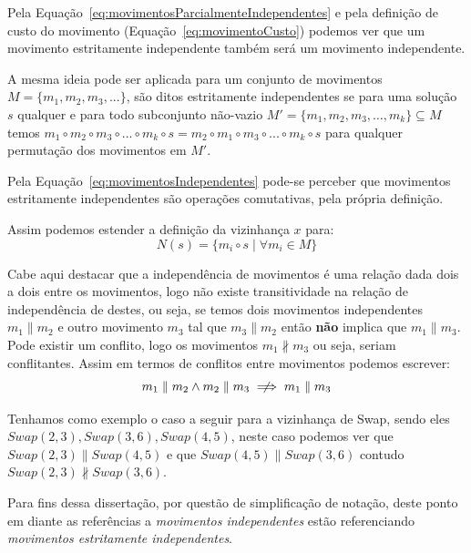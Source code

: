 Pela Equação~\ref{eq:movimentosParcialmenteIndependentes} e pela definição de custo do movimento (Equação~\ref{eq:movimentoCusto}) podemos ver que um movimento estritamente independente também será um movimento independente.

A mesma ideia pode ser aplicada para um conjunto de movimentos $M = \{ m_1, m_2, m_3, ...\}$, são ditos estritamente independentes se para uma solução $s$ qualquer e para todo subconjunto não-vazio $M' = \{ m_1, m_2, m_3, \dots, m_k \} \subseteq M$ temos $m_1 \circ m_2 \circ m_3 \circ ...\circ m_k \circ s = m_2 \circ m_1 \circ m_3 \circ ...\circ m_k \circ s$ para qualquer permutação dos movimentos em $M'$.

Pela Equação~\ref{eq:movimentosIndependentes} pode-se perceber que movimentos estritamente independentes são operações comutativas, pela própria definição.

Assim podemos estender a definição da vizinhança $x$ para:
\begin{equation}  \label{eq:vizinhanca}
N(s) = \{ m_i \circ s \mid \forall m_i \in M \}
\end{equation}

Cabe aqui destacar que a independência de movimentos é uma relação dada dois a dois entre os movimentos, logo não existe transitividade na relação de independência de destes, ou seja, se temos dois movimentos independentes $m_1 \parallel m_2$ e outro movimento $m_3$ tal que $m_3 \parallel m_2$ então \textbf{não} implica que $m_1 \parallel m_3$.
Pode existir um conflito, logo os movimentos $m_1 \nparallel m_3$ ou seja, seriam conflitantes.
Assim em termos de conflitos entre movimentos podemos escrever:
\begin{equation}
m_1 \parallel m_2 \land m_2 \parallel m_3 \centernot\implies m_1 \parallel m_3
\end{equation}

Tenhamos como exemplo o caso a seguir para a vizinhança de Swap, sendo eles $Swap(2,3), Swap(3,6), Swap(4,5)$, neste caso podemos ver que $Swap(2,3) \parallel Swap(4,5)$ e que $Swap(4,5) \parallel Swap(3,6)$ contudo $Swap(2,3) \nparallel Swap(3,6)$.

Para fins dessa dissertação, por questão de simplificação de notação, deste ponto em diante as referências a \textit{movimentos independentes} estão referenciando \textit{movimentos estritamente independentes}.

